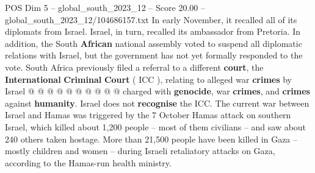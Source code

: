 \begin{textsample}{POS Dim 5 – global\_south\_2023\_12 – Score 20.00 – global\_south\_2023\_12/104686157.txt}
In early November, it recalled all of its diplomats from Israel.
Israel, in turn, recalled its ambassador from Pretoria.
In addition, the South \textbf{African} national assembly voted to suspend all diplomatic relations with Israel, but the government has not yet formally responded to the vote.
South Africa previously filed a referral to a different \textbf{court}, the \textbf{International} \textbf{Criminal} \textbf{Court} ( ICC ), relating to alleged war \textbf{crimes} by Israel @ @ @ @ @ @ @ @ @ @ charged with \textbf{genocide}, war \textbf{crimes}, and \textbf{crimes} against \textbf{humanity}.
Israel does not \textbf{recognise} the ICC.
The current war between Israel and Hamas was triggered by the 7 October Hamas attack on southern Israel, which killed about 1,200 people -- most of them civilians -- and saw about 240 others taken hostage.
More than 21,500 people have been killed in Gaza -- mostly children and women -- during Israeli retaliatory attacks on Gaza, according to the Hamas-run health ministry.

\end{textsample}
